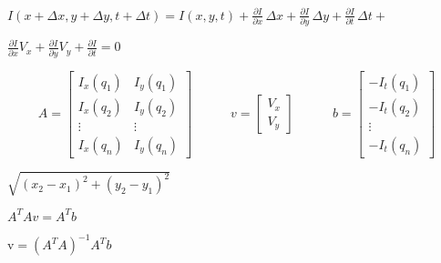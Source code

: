 \documentclass{article}
\begin{document}
$ I(x+\Delta x,y+\Delta y,t+\Delta t) = I(x,y,t) + \frac{\partial I}{\partial x}\,\Delta x+\frac{\partial I}{\partial y}\,\Delta y+\frac{\partial I}{\partial t} \, \Delta t+{} $
\pagebreak

$ \frac{\partial I}{\partial x}V_x+\frac{\partial I}{\partial y}V_y+\frac{\partial I}{\partial t} = 0 $
\pagebreak

\[ A = \begin{bmatrix} I_x(q_1) & I_y(q_1) \\[10pt] I_x(q_2) & I_y(q_2) \\[10pt] \vdots & \vdots \\[10pt] I_x(q_n) & I_y(q_n) \end{bmatrix} \quad\quad\quad v = \begin{bmatrix} V_x\\[10pt] V_y \end{bmatrix} \quad\quad\quad b = \begin{bmatrix} -I_t(q_1) \\[10pt] -I_t(q_2) \\[10pt] \vdots \\[10pt] -I_t(q_n) \end{bmatrix} \]
\pagebreak

$\sqrt{(x_2-x_1)^2+(y_2-y_1)^2}$
\pagebreak

$ A^T A v=A^T b $
\pagebreak

$ \mathrm{v}=(A^T A)^{-1}A^T b $
\pagebreak
\end{document}

